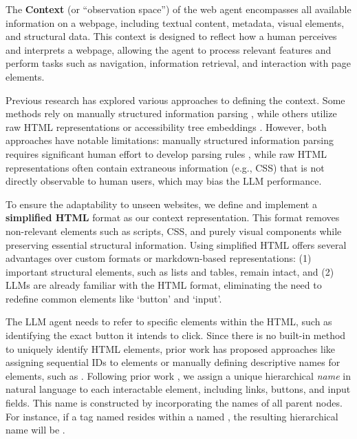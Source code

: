 \documentclass[11pt]{article}
\begin{document}
The \textbf{Context} (or ``observation space'') of the web agent encompasses all available information on a webpage, including textual content, metadata, visual elements, and structural data. This context is designed to reflect how a human perceives and interprets a webpage, allowing the agent to process relevant features and perform tasks such as navigation, information retrieval, and interaction with page elements.  

Previous research has explored various approaches to defining the context. Some methods rely on manually structured information parsing \cite{yaoWebShopScalableRealWorld2022}, while others utilize raw HTML representations \cite{gurRealWorldWebAgentPlanning2023} or accessibility tree embeddings \cite{zhouWebArenaRealisticWeb2024}. However, both approaches have notable limitations: manually structured information parsing requires significant human effort to develop parsing rules \cite{yaoWebShopScalableRealWorld2022}, while raw HTML representations often contain extraneous information (e.g., CSS) that is not directly observable to human users, which may bias the LLM performance.  

To ensure the adaptability to unseen websites, we define and implement a \textbf{simplified HTML} format as our context representation. This format removes non-relevant elements such as scripts, CSS, and purely visual components while preserving essential structural information. Using simplified HTML offers several advantages over custom formats or markdown-based representations: (1) important structural elements, such as lists and tables, remain intact, and (2) LLMs are already familiar with the HTML format, eliminating the need to redefine common elements like `button' and `input'.

The LLM agent needs to refer to specific elements within the HTML, such as identifying the exact button it intends to click. Since there is no built-in method to uniquely identify HTML elements, prior work has proposed approaches like assigning sequential IDs to elements \cite{kohVisualWebArenaEvaluatingMultimodal2024} or manually defining descriptive names for elements, such as  \cite{yaoWebShopScalableRealWorld2022}. Following prior work \cite{luUXAgentLLMAgentBased2025}, we assign a unique hierarchical \textit{name} in natural language to each interactable element, including links, buttons, and input fields. This name is constructed by incorporating the names of all parent nodes. For instance, if a  tag named  resides within a  named , the resulting hierarchical name will be .
\end{document}
